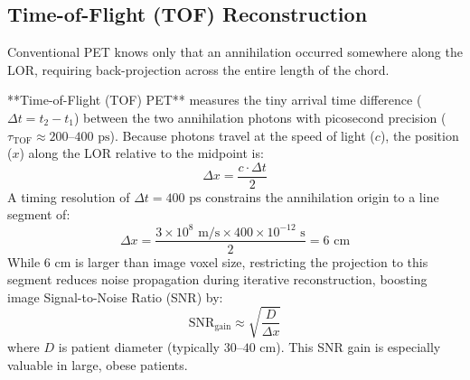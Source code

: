 \documentclass[11pt,a4paper]{article}
\begin{document}
\subsection{Time-of-Flight (TOF) Reconstruction}
Conventional PET knows only that an annihilation occurred somewhere along the LOR, requiring back-projection across the entire length of the chord.

**Time-of-Flight (TOF) PET** measures the tiny arrival time difference ($\Delta t = t_2 - t_1$) between the two annihilation photons with picosecond precision ($\tau_{\text{TOF}} \approx 200\text{--}400\text{ ps}$). Because photons travel at the speed of light ($c$), the position ($x$) along the LOR relative to the midpoint is:
\begin{equation}
    \Delta x = \frac{c \cdot \Delta t}{2}
\end{equation}
A timing resolution of $\Delta t = 400\text{ ps}$ constrains the annihilation origin to a line segment of:
\begin{equation}
    \Delta x = \frac{3 \times 10^8\text{ m/s} \times 400 \times 10^{-12}\text{ s}}{2} = 6\text{ cm}
\end{equation}
While $6\text{ cm}$ is larger than image voxel size, restricting the projection to this segment reduces noise propagation during iterative reconstruction, boosting image Signal-to-Noise Ratio (SNR) by:
\begin{equation}
    \text{SNR}_{\text{gain}} \approx \sqrt{\frac{D}{\Delta x}}
\end{equation}
where $D$ is patient diameter (typically $30\text{--}40\text{ cm}$). This SNR gain is especially valuable in large, obese patients.
\end{document}
